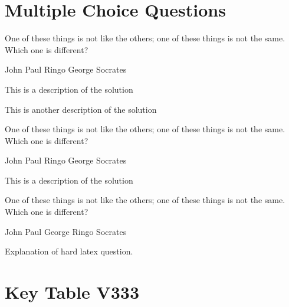 \documentclass[
  12pt,
  addpoints]{exam}
\begin{document}
\section{Multiple Choice Questions}\label{multiple-choice-questions}

\hrulefill{}

\begin{questions}

\question[1]{} One of these things is not like the others; one of these
things is not the same. Which one is different?

\begin{randomizechoices}
\choice{} John \choice{} Paul \choice{} Ringo \choice{} George
\CorrectChoice{} Socrates

\end{randomizechoices}

\begin{solution}
This is a description of the solution
\end{solution}


\begin{randomizechoices}
   

\end{randomizechoices}

\begin{solution}
This is another description of the solution
\end{solution}

\question[1]{} One of these things is not like the others; one of these
things is not the same. Which one is different?

\begin{randomizechoices}
\choice John \choice Paul \choice Ringo \choice George
\CorrectChoice Socrates

\end{randomizechoices}

\begin{solution}
This is a description of the solution
\end{solution}

\question[5]One of these things is not like the others; one of these
things is not the same. Which one is different?

\begin{randomizeoneparcheckboxes}
\choice John
\choice Paul
\choice George
\choice Ringo
\CorrectChoice Socrates
\end{randomizeoneparcheckboxes}

\begin{solution}

Explanation of hard latex question.

\end{solution}

\end{questions}

\newpage{}

\section{Key Table V333}\label{key-table}

\hrulefill{}

\printkeytable{}
\end{document}
